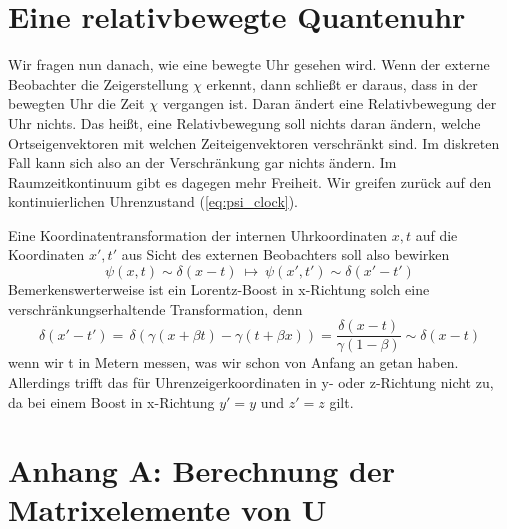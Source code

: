 \documentclass[12pt]{article}
\begin{document}
\section{Eine relativbewegte Quantenuhr}

Wir fragen nun danach, wie eine bewegte Uhr gesehen wird. Wenn der externe Beobachter die Zeigerstellung $\chi$ erkennt, dann schließt er daraus, dass in der bewegten Uhr die Zeit $\chi$ vergangen ist. Daran ändert eine Relativbewegung der Uhr nichts. Das heißt, eine Relativbewegung soll nichts daran ändern, welche Ortseigenvektoren mit welchen Zeiteigenvektoren verschränkt sind. Im diskreten Fall kann sich also an der Verschränkung gar nichts ändern. Im Raumzeitkontinuum gibt es dagegen mehr Freiheit. Wir greifen zurück auf den kontinuierlichen Uhrenzustand (\ref{eq:psi_clock}). 

Eine Koordinatentransformation der internen Uhrkoordinaten $x,t$ auf die Koordinaten $x',t'$ aus Sicht des externen Beobachters soll also bewirken
\begin{equation} 
\psi(x,t) \sim \delta(x-t)\ \longmapsto \ \psi(x',t') \sim \delta(x'-t')
\end{equation} 
Bemerkenswerterweise ist ein Lorentz-Boost in x-Richtung solch eine verschränkungserhaltende Transformation, denn
\begin{equation} 
\delta(x'-t') =\, \delta(\gamma (x + \beta t) - \gamma (t + \beta x)) 
= \frac{\delta(x-t)}{\gamma (1-\beta)} \sim \delta(x-t)
\end{equation}
wenn wir t in Metern messen, was wir schon von Anfang an getan haben. Allerdings trifft das für Uhrenzeigerkoordinaten in y- oder z-Richtung nicht zu, da bei einem Boost in x-Richtung $y'=y$ und $z'=z$ gilt.

\section{Anhang A: Berechnung der Matrixelemente von U}
\end{document}
